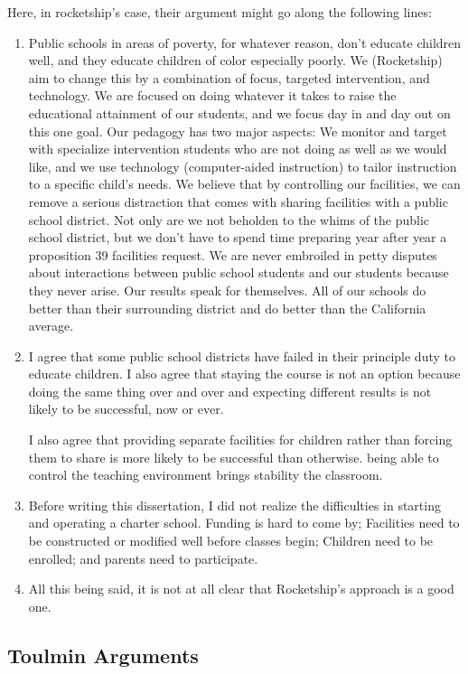 Here, in rocketship's case, their argument might go along the following lines:
\begin{enumerate}
  \item Public schools in areas of poverty, for whatever reason, don't educate children well, and they educate children of color especially poorly. We (Rocketship) aim to change this by a combination of focus, targeted intervention, and technology. We are focused on doing whatever it takes to raise the educational attainment of our students, and we focus day in and day out on this one goal. Our pedagogy has two major aspects: We monitor and target with specialize intervention students who are not doing as well as we would like, and we use technology (computer-aided instruction) to tailor instruction to a specific child's needs. We believe that by controlling our facilities, we can remove a serious distraction that comes with sharing facilities with a public school district. Not only are we not beholden to the whims of the public school district, but we don't have to spend time preparing year after year a proposition 39 facilities request. We are never embroiled in petty disputes about interactions between public school students and our students because they never arise. Our results speak for themselves. All of our schools do better than their surrounding district and do better than the California average.
      \item I agree that some public school districts have failed in their principle duty to educate children. I also agree that staying the course is not an option because doing the same thing over and over and expecting different results is not likely to be successful, now or ever.
 
 I also agree that providing separate facilities for children rather than forcing them to share is more likely to be successful than otherwise. being able to control the teaching environment brings stability the classroom.
    \item Before writing this dissertation, I did not realize the difficulties in starting and operating a charter school. Funding is hard to come by; Facilities need to be constructed or modified well before classes begin; Children need to be enrolled; and parents need to participate. 
  \item All this being said, it is not at all clear that Rocketship's approach is a good one.
\end{enumerate}

\subsection{Toulmin Arguments}%
\label{sec:toulmin-arguments}\indent%

